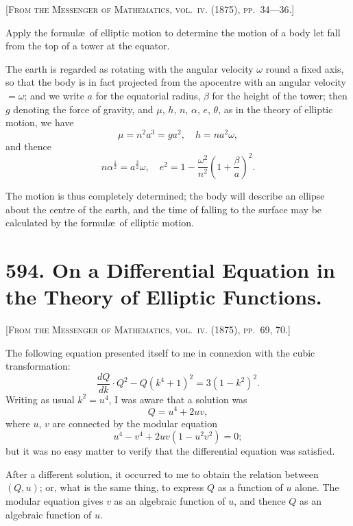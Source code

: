 \documentclass[11pt,a4paper]{book}
\begin{document}
\noindent\textsc{[From the Messenger of Mathematics, vol.~\textsc{iv}. (1875), pp.~34---36.]}

\medskip

\noindent Apply the formul\ae\ of elliptic motion to determine the motion of a body let fall from the top of a tower at the equator.

The earth is regarded as rotating with the angular velocity $\omega$ round a fixed axis, so that the body is in fact projected from the apocentre with an angular velocity $= \omega$; and we write $a$ for the equatorial radius, $\beta$ for the height of the tower; then $g$ denoting the force of gravity, and $\mu$, $h$, $n$, $\alpha$, $e$, $\theta$, as in the theory of elliptic motion, we have
\[
\mu = n^2 a^3 = g a^2, \quad h = n a^2 \omega,
\]
and thence
\[
n\alpha^{\frac{1}{2}} = a^{\frac{3}{2}} \omega, \quad e^2 = 1 - \frac{\omega^2}{n^2} \left(1 + \frac{\beta}{a}\right)^2.
\]

The motion is thus completely determined; the body will describe an ellipse about the centre of the earth, and the time of falling to the surface may be calculated by the formul\ae\ of elliptic motion.

\newpage

\section*{594. On a Differential Equation in the Theory of Elliptic Functions.}

\noindent\textsc{[From the Messenger of Mathematics, vol.~\textsc{iv}. (1875), pp.~69, 70.]}

\medskip

\noindent The following equation presented itself to me in connexion with the cubic transformation:
\[
\frac{dQ}{dk} \cdot Q^2 - Q(k^4 + 1)^2 = 3(1 - k^2)^2.
\]
Writing as usual $k^2 = u^4$, I was aware that a solution was
\[
Q = u^4 + 2uv,
\]
where $u$, $v$ are connected by the modular equation
\[
u^4 - v^4 + 2uv(1 - u^2 v^2) = 0;
\]
but it was no easy matter to verify that the differential equation was satisfied.

After a different solution, it occurred to me to obtain the relation between $(Q, u)$; or, what is the same thing, to express $Q$ as a function of $u$ alone. The modular equation gives $v$ as an algebraic function of $u$, and thence $Q$ as an algebraic function of $u$.
\end{document}

